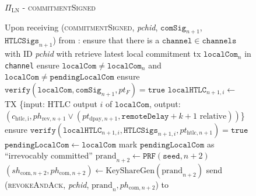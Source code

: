 \begin{figure}[!htbp]
\begin{protocolbox}{$\Pi_{\mathrm{LN}}$ - \textsc{commitmentSigned}}
  \begin{algorithmic}[1]
    \State Upon receiving (\textsc{commitmentSigned}, \textit{pchid},
    $\mathtt{comSig}_{n+1}$, $\mathtt{HTLCSigs}_{n+1}$) from \bob:
    \Indent
      \State ensure that there is a $\mathtt{channel} \in \mathtt{channels}$
      with ID \textit{pchid} with \bob
      \State retrieve latest local commitment tx $\mathtt{localCom}_n$ in
      \texttt{channel}
      \State ensure $\mathtt{localCom} \neq \mathtt{localCom}_n$ and
      $\mathtt{localCom} \neq \mathtt{pendingLocalCom}$
      \State ensure $\mathtt{verify}\left(\mathtt{localCom},
      \mathtt{comSig}_{n+1}, pt_F\right) = \mathtt{true}$
        \State $\mathtt{localHTLC}_{n+1, i} \gets$ TX \{input: HTLC output $i$
        of $\mathtt{localCom}$, output: $\left(c_{\mathrm{htlc, i}},
        ph_{\mathrm{rev}, n+1} \vee \left(pt_{\mathrm{dpay}, n+1},
        \mathtt{remoteDelay} + k + 1 \text{ relative}\right)\right)$\}
        \State ensure $\mathtt{verify}\left(\mathtt{localHTLC}_{n+1, i},
        \mathtt{HTLCSigs}_{n+1, i}, pt_{\mathrm{htlc}, n+1}\right) =
        \mathtt{true}$
      \EndFor
      \State $\mathtt{pendingLocalCom} \gets \mathtt{localCom}$
      \State mark $\mathtt{pendingLocalCom}$ as ``irrevocably committed''
      \State $\mathrm{prand}_{n+2} \gets \texttt{PRF}\left(\mathtt{seed},
      n+2\right)$
      \State $\left(sh_{\mathrm{com}, n+2}, ph_{\mathrm{com}, n+2}\right) \gets
      \mathrm{KeyShareGen}\left(\mathrm{prand}_{n+2}\right)$
      \State send (\textsc{revokeAndAck}, \textit{pchid}, $\mathrm{prand}_n,
      ph_{\mathrm{com}, n+2}$) to \bob
    \EndIndent
  \end{algorithmic}
\end{protocolbox}
\caption{}
\label{alg:protocol:pay:commitmentSigned}
\end{figure}

